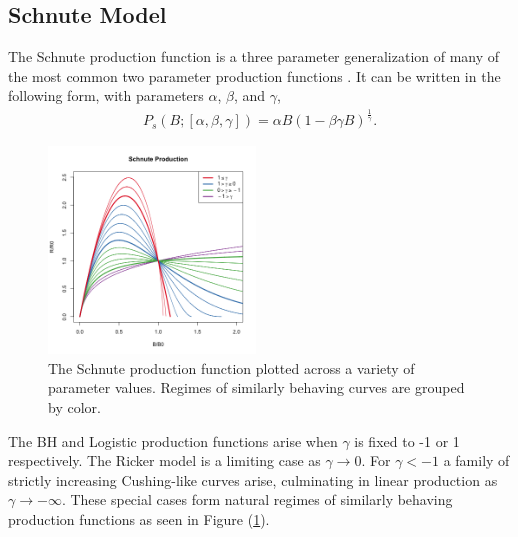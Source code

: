 %
%



%
\subsection{Schnute Model}

%
The Schnute production function is a three parameter generalization of many of 
the most common two parameter production functions . %
It can be written in the following form, with parameters $\alpha$, $\beta$, and $\gamma$,
%
\begin{align}
P_s(B; [\alpha, \beta, \gamma]) = \alpha B (1-\beta\gamma B)^{\frac{1}{\gamma}}.
\end{align}

%
\begin{figure}
\vspace{-0.6cm}
\includegraphics[width=0.49\textwidth]{../gpBias/g3.png}
\vspace{-1cm}
\caption{
The Schnute production function plotted across a variety of parameter
values. Regimes of similarly behaving curves are grouped by color.
}
\label{sRegimes}
\end{figure}

%
The BH and Logistic production functions arise when $\gamma$ is fixed to -1 or 
1 respectively. The Ricker model is a limiting case as $\gamma\rightarrow0$. %
For $\gamma<-1$ a family of strictly increasing Cushing-like curves arise, 
culminating in linear production as $\gamma\to-\infty$. These special cases form
natural regimes of similarly behaving production functions as seen in Figure (\ref{sRegimes}).

